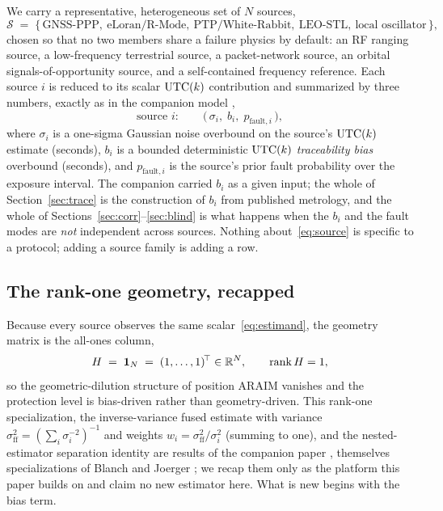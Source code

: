 We carry a representative, heterogeneous set of $N$ sources,
\begin{equation}
  \mathcal S \;=\;
  \{\,\text{GNSS-PPP},\ \text{eLoran/R-Mode},\ \text{PTP/White-Rabbit},\
      \text{LEO-STL},\ \text{local oscillator}\,\},
  \label{eq:sourceset}
\end{equation}
chosen so that no two members share a failure physics by default: an RF ranging
source, a low-frequency terrestrial source, a packet-network source, an orbital
signals-of-opportunity source, and a self-contained frequency reference. Each
source $i$ is reduced to its scalar $\mathrm{UTC}(k){}$ contribution and summarized by three
numbers, exactly as in the companion model \citep{baweja2026cti},
\begin{equation}
  \text{source } i:\qquad \big(\,\sigma_i,\; b_i,\; p_{\mathrm{fault},i}\,\big),
  \label{eq:source}
\end{equation}
where $\sigma_i$ is a one-sigma Gaussian noise overbound on the source's $\mathrm{UTC}(k){}$
estimate (seconds), $b_i$ is a bounded deterministic $\mathrm{UTC}(k){}$ \emph{traceability
bias} overbound (seconds), and $p_{\mathrm{fault},i}$ is the source's prior fault
probability over the exposure interval. The companion carried $b_i$ as a given
input; the whole of Section~\ref{sec:trace} is the construction of $b_i$ from
published metrology, and the whole of Sections~\ref{sec:corr}--\ref{sec:blind} is
what happens when the $b_i$ and the fault modes are \emph{not} independent across
sources. Nothing about~\eqref{eq:source} is specific to a protocol; adding a source
family is adding a row.

\subsection{The rank-one geometry, recapped}
\label{sec:rankone}

Because every source observes the same scalar~\eqref{eq:estimand}, the geometry
matrix is the all-ones column,
\begin{equation}
  H \;=\; \bm 1_N \;=\; (1,\dots,1)^{\!\top}\in\mathbb{R}^{N},
  \qquad \operatorname{rank}H = 1,
  \label{eq:h1n}
\end{equation}
so the geometric-dilution structure of position ARAIM vanishes and the protection
level is bias-driven rather than geometry-driven. This rank-one specialization, the
inverse-variance fused estimate with variance
$\sigma_{\mathrm{ff}}^2=(\sum_i\sigma_i^{-2})^{-1}$ and weights
$w_i=\sigma_{\mathrm{ff}}^2/\sigma_i^2$ (summing to one), and the nested-estimator
separation identity are \Cited{} results of the companion paper
\citep{baweja2026cti}, themselves specializations of Blanch \citep{blanch2015} and
Joerger \citep{joerger2014}; we recap them only as the platform this paper builds
on and claim no new estimator here. What is new begins with the bias term.

